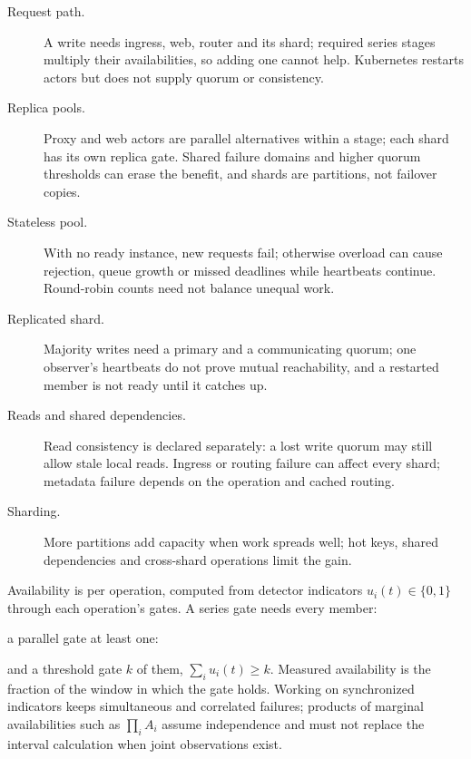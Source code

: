 \begin{description}
  \item[Request path.] A write needs ingress, web, router and its shard; required
    series stages multiply their availabilities, so adding one cannot help.
    Kubernetes restarts actors but does not supply quorum or consistency.
  \item[Replica pools.] Proxy and web actors are parallel alternatives within a
    stage; each shard has its own replica gate. Shared failure domains and higher
    quorum thresholds can erase the benefit, and shards are partitions, not
    failover copies.
  \item[Stateless pool.] With no ready instance, new requests fail; otherwise
    overload can cause rejection, queue growth or missed deadlines while heartbeats
    continue. Round-robin counts need not balance unequal work.
  \item[Replicated shard.] Majority writes need a primary and a communicating
    quorum; one observer's heartbeats do not prove mutual reachability, and a
    restarted member is not ready until it catches up.
  \item[Reads and shared dependencies.] Read consistency is declared separately:
    a lost write quorum may still allow stale local reads. Ingress or routing
    failure can affect every shard; metadata failure depends on the operation and
    cached routing.
  \item[Sharding.] More partitions add capacity when work spreads well; hot keys,
    shared dependencies and cross-shard operations limit the gain.
\end{description}

Availability is per operation, computed from detector indicators
$u_i(t)\in\{0,1\}$ through each operation's gates. A series gate needs every
member:


a parallel gate at least one:


and a threshold gate $k$ of them, $\sum_i u_i(t)\geq k$. Measured availability is
the fraction of the window in which the gate holds. Working on synchronized
indicators keeps simultaneous and correlated failures; products of marginal
availabilities such as $\prod_i A_i$ assume independence and must not replace the
interval calculation when joint observations exist.

